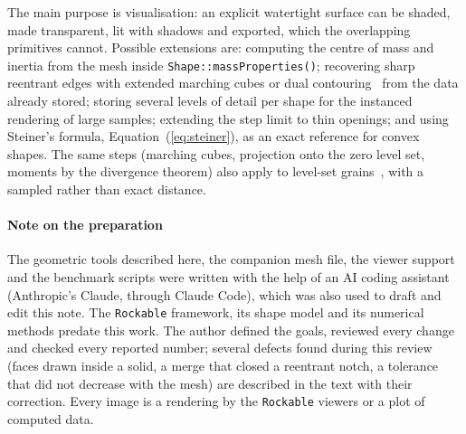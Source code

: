\documentclass[11pt,a4paper]{article}
\newcommand{\code}[1]{\texttt{#1}}
\begin{document}
The main purpose is visualisation: an explicit watertight surface can be shaded,
made transparent, lit with shadows and exported, which the overlapping primitives
cannot. Possible extensions are: computing the centre of mass and inertia from the
mesh inside \code{Shape::massProperties()}; recovering sharp reentrant
edges with extended marching cubes or dual contouring~\cite{kobbelt2001,ju2002}
from the data already stored; storing several levels of detail per shape for the
instanced rendering of large samples; extending the step limit to thin openings;
and using Steiner's formula, Equation~(\ref{eq:steiner}), as an exact reference
for convex shapes. The same steps (marching cubes, projection onto the zero level
set, moments by the divergence theorem) also apply to level-set
grains~\cite{kawamoto2016,kawamoto2018}, with a sampled rather than exact distance.

\paragraph{Note on the preparation} The geometric tools described here, the
companion mesh file, the viewer support and the benchmark scripts were written with
the help of an AI coding assistant (Anthropic's Claude, through Claude Code), which
was also used to draft and edit this note. The \code{Rockable} framework, its shape
model and its numerical methods predate this work. The author defined the goals,
reviewed every change and checked every reported number; several defects found
during this review (faces drawn inside a solid, a merge that closed a reentrant
notch, a tolerance that did not decrease with the mesh) are described in the text
with their correction. Every image is a rendering by the \code{Rockable} viewers or
a plot of computed data.

\small


\end{document}
